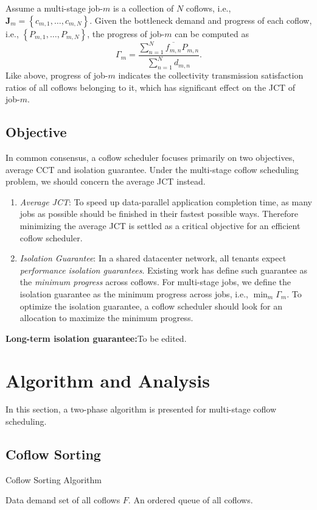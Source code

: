 \documentclass[10pt, conference, letterpaper]{IEEEtran}
\begin{document}
Assume a multi-stage job-$m$ is a collection of $N$ coflows, i.e., $\mathbf{J}_m=\left\{c_{m,1},\dots,c_{m,N}\right\}$. Given the bottleneck demand and progress of each coflow, i.e., $\left\{P_{m,1},\dots,P_{m,N}\right\}$, the progress of job-$m$ can be computed as
\begin{equation}
	\Gamma_m = \frac{\sum_{n=1}^N \overline{f_{m,n}}P_{m,n}}{\sum_{n=1}^N d_{m,n}}.
\end{equation}
Like above, progress of job-$m$ indicates the collectivity transmission satisfaction ratios of all coflows belonging to it, which has significant effect on the JCT of job-$m$.

\subsection{Objective}
In common consensus\cite{coflow}, a coflow scheduler focuses primarily on two objectives, average CCT and isolation guarantee. Under the multi-stage coflow  scheduling problem, we should concern the average JCT instead.

\begin{enumerate}
	\item \emph{Average JCT}: To speed up data-parallel application completion time, as many jobs as possible should be finished in their fastest possible ways. Therefore minimizing the average JCT is settled as a critical objective for an efficient coflow scheduler.
	\item \emph{Isolation Guarantee}: In a shared datacenter network, all tenants expect \emph{performance isolation guarantees}. Existing work has define such guarantee as the \emph{minimum progress} across coflows\cite{HUG}. For multi-stage jobs, we define the isolation guarantee as the minimum progress across jobs, i.e., $\min_m \Gamma_m$. To optimize the isolation guarantee, a coflow scheduler should look for an allocation to maximize the minimum progress.
\end{enumerate}

\textbf{Long-term isolation guarantee:}To be edited.

\section{Algorithm and Analysis}
In this section, a two-phase algorithm is presented for multi-stage coflow scheduling.

\subsection{Coflow Sorting}
\begin{algorithm}
	\caption{Coflow Sorting Algorithm}
	\begin{algorithmic}
		\REQUIRE Data demand set of all coflows $F$.
		\ENSURE An ordered queue of all coflows. 
		
	\end{algorithmic}
\end{algorithm}
\end{document}
